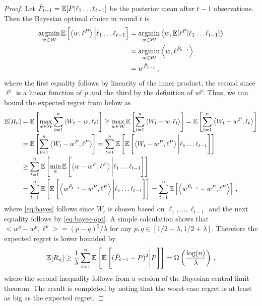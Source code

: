 \begin{proof}
	Let $\hat P_{t-1} = \mathbb{E}[P|\ell_1 \ldots \ell_{t-1}]$ be the posterior mean after $t-1$ observations. 
	Then the Bayesian optimal choice in round $t$ is 
	\begin{align}
	\operatorname*{argmin}_{w \in \mathcal W} \mathbb{E}\left[\left\langle w, \ell^P\right\rangle\Big| \ell_1\ldots\ell_{t-1}\right]
	&= \operatorname*{argmin}_{w \in \mathcal W} \left\langle w, \mathbb{E}[\ell^P|\ell_1 \ldots \ell_{t-1}]\right\rangle \nonumber \\
	&= \operatorname*{argmin}_{w \in \mathcal W} \left\langle w, \ell^{\hat P_{t-1}}\right\rangle \nonumber \\
	&= w^{\hat P_{t-1}}\,,
	\label{eq:bayes-opt}
	\end{align}
	where the first equality follows by linearity of the inner product, the second since $\ell^p$ is a linear function of $p$ and the third
	by the definition of $w^p$.
	Thus, we can bound the expected regret from below as
	\begin{align}
	\mathbb{E}[R_n] 
	&= \mathbb{E}\left[\max_{w \in \mathcal W} \sum_{t=1}^n \left\langle W_t - w, \ell_t\right\rangle\right]  
	\geq \max_{w \in \mathcal W} \mathbb{E}\left[ \sum_{t=1}^n \left\langle W_t - w, \ell_t\right\rangle\right] 
	= \mathbb{E}\left[\sum_{t=1}^n \left\langle W_t - w^P, \ell_t\right\rangle \right] \nonumber \\
	&= \mathbb{E}\left[\sum_{t=1}^n \left\langle W_t - w^P, \ell^P\right\rangle \right]
	= \sum_{t=1}^n \mathbb{E}\left[\mathbb{E}\left[\left\langle W_t - w^P, \ell^P\right\rangle\Bigg|\ell_1\ldots \ell_{t-1}\right]\right]\nonumber \\
	&\ge \sum_{t=1}^n \mathbb{E}\left[\min_w \mathbb{E}\left[\left\langle w - w^P, \ell^P\right\rangle\Bigg|\ell_1\ldots \ell_{t-1}\right]\right] \label{eq:bayes} \\
	&= \sum_{t=1}^n \mathbb{E}\left[\mathbb{E}\left[\left\langle w^{\hat P_{t-1}} - w^P, \ell^P\right\rangle \Bigg| \ell_1\ldots \ell_{t-1}\right]\right] 
	= \sum_{t=1}^n \mathbb{E}\left[\left\langle w^{\hat P_{t-1}} - w^P, \ell^P\right\rangle \right]\,, \nonumber
	\end{align}
	where  \cref{eq:bayes} follows since $W_t$ is chosen based on $\ell_1,\dots,\ell_{t-1}$ and the next equality follows 
	by \cref{eq:bayes-opt}.
	A simple calculation shows that $\big<w^q - w^p, \ell^p\big> = (p - q)^2 / \lambda$ for any $p, q \in [1/2-\lambda, 1/2+\lambda]$.
	Therefore the expected regret is lower bounded by
	\begin{align*}
	\mathbb{E}[R_n] 
	\geq \frac{1}{\lambda} \sum_{t=1}^n \mathbb{E}\left[\mathbb{E}\left[(\hat P_{t-1} - P)^2\Bigg|P\right]\right]
	= \Omega\left(\frac{\log(n)}{\lambda}\right)\,,
	\end{align*}
	where the second inequality follows from a version of the Bayesian central limit theorem. 
	The result is completed by noting that the worst-case regret is at least as big as the expected regret.
\end{proof}

